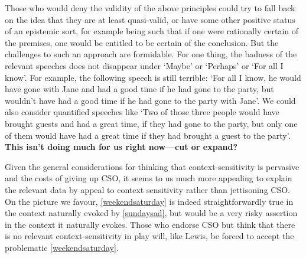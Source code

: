 \documentclass[If.tex]{subfiles}
\begin{document}
Those who would deny the validity of the above principles could try to fall back on the idea that they are at least quasi-valid, or have some other positive status of an epistemic sort, for example being such that if one were rationally certain of the premises, one would be entitled to be certain of the conclusion. But the challenges to such an approach are formidable. For one thing, the badness of the relevant speeches does not disappear under ‘Maybe’ or ‘Perhaps’ or ‘For all I know’. For example, the following speech is still terrible: ‘For all I know, he would have gone with Jane and had a good time if he had gone to the party, but wouldn't have had a good time if he had gone to the party with Jane’. We could also consider quantified speeches like ‘Two of those three people would have brought guests and had a great time, if they had gone to the party, but only one of them would have had a great time if they had brought a guest to the party’. \textbf{This isn't doing much for us right now---cut or expand?}

Given the general considerations for thinking that context-sensitivity is pervasive and the costs of giving up CSO, it seems to us much more appealing to explain the relevant data by appeal to context sensitivity rather than jettisoning CSO. On the picture we favour, \ref{weekendsaturday} is indeed straightforwardly true in the context naturally evoked by \ref{sundaysad}, but would be a very risky assertion in the context it naturally evokes. Those who endorse CSO but think that there is no relevant context-sensitivity in play will, like Lewis, be forced to accept the problematic \ref{weekendsaturday}.
\end{document}
